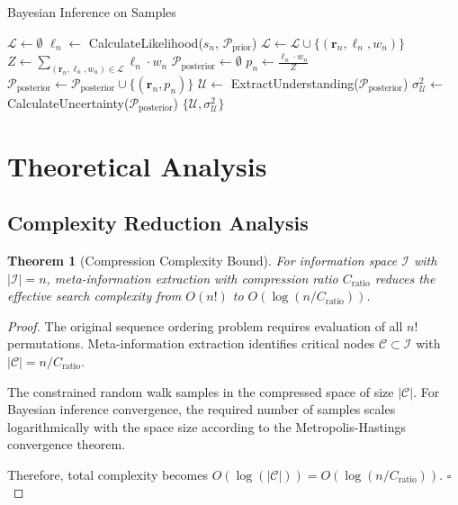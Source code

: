 \documentclass[12pt,a4paper]{article}
\newtheorem{theorem}{Theorem}
\begin{document}
\begin{algorithm}[H]
\caption{Bayesian Inference on Samples}
\begin{algorithmic}[1]
    \State $\mathcal{L} \leftarrow \emptyset$ 
        \State $\ell_n \leftarrow$ CalculateLikelihood($s_n$, $\mathcal{P}_{\text{prior}}$)
        \State $\mathcal{L} \leftarrow \mathcal{L} \cup \{(\mathbf{r}_n, \ell_n, w_n)\}$
    \EndFor
    \State $Z \leftarrow \sum_{(\mathbf{r}_n, \ell_n, w_n) \in \mathcal{L}} \ell_n \cdot w_n$ 
    \State $\mathcal{P}_{\text{posterior}} \leftarrow \emptyset$
        \State $p_n \leftarrow \frac{\ell_n \cdot w_n}{Z}$
        \State $\mathcal{P}_{\text{posterior}} \leftarrow \mathcal{P}_{\text{posterior}} \cup \{(\mathbf{r}_n, p_n)\}$
    \EndFor
    \State $\mathcal{U} \leftarrow$ ExtractUnderstanding($\mathcal{P}_{\text{posterior}}$)
    \State $\sigma_{\mathcal{U}}^2 \leftarrow$ CalculateUncertainty($\mathcal{P}_{\text{posterior}}$)
    \State \Return $\{\mathcal{U}, \sigma_{\mathcal{U}}^2\}$
\EndProcedure
\end{algorithmic}
\end{algorithm}

\section{Theoretical Analysis}

\subsection{Complexity Reduction Analysis}

\begin{theorem}[Compression Complexity Bound]
For information space $\mathcal{I}$ with $|\mathcal{I}| = n$, meta-information extraction with compression ratio $C_{\text{ratio}}$ reduces the effective search complexity from $O(n!)$ to $O(\log(n/C_{\text{ratio}}))$.
\end{theorem}

\begin{proof}
The original sequence ordering problem requires evaluation of all $n!$ permutations. Meta-information extraction identifies critical nodes $\mathcal{C} \subset \mathcal{I}$ with $|\mathcal{C}| = n/C_{\text{ratio}}$. 

The constrained random walk samples in the compressed space of size $|\mathcal{C}|$. For Bayesian inference convergence, the required number of samples scales logarithmically with the space size according to the Metropolis-Hastings convergence theorem.

Therefore, total complexity becomes $O(\log(|\mathcal{C}|)) = O(\log(n/C_{\text{ratio}}))$. $\square$
\end{proof}
\end{document}
